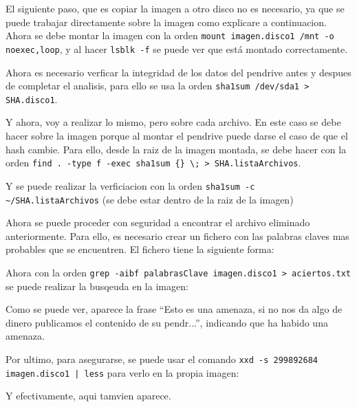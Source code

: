 \documentclass{article}
\begin{document}
El siguiente paso, que es copiar la imagen a otro disco no es necesario, ya que se puede trabajar directamente sobre la imagen como explicare a continuacion. Ahora se debe montar la imagen con la orden \verb|mount imagen.disco1 /mnt -o noexec,loop|, y al hacer \verb|lsblk -f| se puede ver que está montado correctamente.


Ahora es necesario verficar la integridad de los datos del pendrive antes y despues de completar el analisis, para ello se usa la orden \verb|sha1sum /dev/sda1 > SHA.disco1|.


Y ahora, voy a realizar lo mismo, pero sobre cada archivo. En este caso se debe hacer sobre la imagen porque al montar el pendrive puede darse el caso de que el hash cambie. Para ello, desde la raiz de la imagen montada, se debe hacer con la orden \verb|find . -type f -exec sha1sum {} \; > SHA.listaArchivos|.


Y se puede realizar la verficiacion con la orden \verb|sha1sum -c ~/SHA.listaArchivos| (se debe estar dentro de la raiz de la imagen)


Ahora se puede proceder con seguridad a encontrar el archivo eliminado anteriormente. Para ello, es necesario crear un fichero con las palabras claves mas probables que se encuentren. El fichero tiene la siguiente forma:


Ahora con la orden \verb|grep -aibf palabrasClave imagen.disco1 > aciertos.txt| se puede realizar la busqeuda en la imagen:


Como se puede ver, aparece la frase ``Esto es una amenaza, si no nos da algo de dinero publicamos el contenido de su pendr...'', indicando que ha habido una amenaza.

Por ultimo, para asegurarse, se puede usar el comando \texttt{xxd -s 299892684 imagen.disco1 | less} para verlo en la propia imagen:


Y efectivamente, aqui tamvien aparece.

\end{document}
